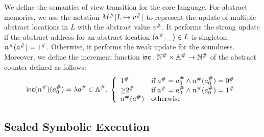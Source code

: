 We define the semantics of view transition for the core language.  For abstract
memories, we use the notation ${M}^{\#}[L \;\dot{\mapsto}\; {v}^{\#}]$ to represent the
update of multiple abstract locations in $L$ with the abstract value ${v}^{\#}$.
It performs the strong update if the abstract address for an abstract location
$({a}^{\#}, \_) \in L$ is singleton: ${n}^{\#}({a}^{\#}) = {1}^{\#}$.
Otherwise, it performs the weak update for the soundness.  Moreover, we define
the increment function $\textsf{inc}: {\mathbb{N}}^{\#} \times {\mathbb{A}}^{\#} \rightarrow
{\mathbb{N}}^{\#}$ of the abstract counter defined as follows:
\[
  \textsf{inc}({n}^{\#})({a}^{\#}_0) = \lambda {a}^{\#} \in {\mathbb{A}}^{\#}. \; \left\{
    \begin{array}{ll}
      {1}^{\#} & \text{if} \; {a}^{\#} = {a}^{\#}_0 \wedge
      {n}^{\#}({a}^{\#}_0) = {0}^{\#}\\
      {\geq\!\!2}^{\#} & \text{if} \; {a}^{\#} = {a}^{\#}_0 \wedge
      {n}^{\#}({a}^{\#}_0) = {1}^{\#}\\
      {n}^{\#}({a}^{\#}) & \text{otherwise}
    \end{array}
  \right.
\]


\subsection{Sealed Symbolic Execution}

